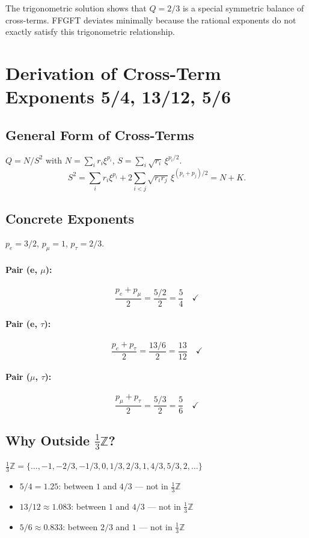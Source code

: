 The trigonometric solution shows that $Q=2/3$ is a special symmetric balance
of cross-terms. FFGFT deviates minimally because the rational exponents do not
exactly satisfy this trigonometric relationship.

\section{Derivation of Cross-Term Exponents 5/4, 13/12, 5/6}


\subsection{General Form of Cross-Terms}

$Q=N/S^2$ with $N=\sum_ir_i\xi^{p_i}$, $S=\sum_i\sqrt{r_i}\,\xi^{p_i/2}$.
\[
  S^2 = \sum_ir_i\xi^{p_i}+2\sum_{i<j}\sqrt{r_ir_j}\,\xi^{(p_i+p_j)/2} = N+K.
\]

\subsection{Concrete Exponents}

$p_e=3/2$, $p_\mu=1$, $p_\tau=2/3$.

\paragraph{Pair (e, $\mu$):}
\[
  \frac{p_e+p_\mu}{2} = \frac{5/2}{2} = \boxed{\frac{5}{4}} \quad\checkmark
\]

\paragraph{Pair (e, $\tau$):}
\[
  \frac{p_e+p_\tau}{2} = \frac{13/6}{2} = \boxed{\frac{13}{12}} \quad\checkmark
\]

\paragraph{Pair ($\mu$, $\tau$):}
\[
  \frac{p_\mu+p_\tau}{2} = \frac{5/3}{2} = \boxed{\frac{5}{6}} \quad\checkmark
\]

\subsection{Why Outside $\tfrac{1}{3}\mathbb{Z}$?}

$\tfrac{1}{3}\mathbb{Z}=\{\ldots,-1,-2/3,-1/3,0,1/3,2/3,1,4/3,5/3,2,\ldots\}$
\begin{itemize}
  \item $5/4=1.25$: between $1$ and $4/3$ --- not in $\tfrac{1}{3}\mathbb{Z}$
  \item $13/12\approx1.083$: between $1$ and $4/3$ --- not in $\tfrac{1}{3}\mathbb{Z}$
  \item $5/6\approx0.833$: between $2/3$ and $1$ --- not in $\tfrac{1}{3}\mathbb{Z}$
\end{itemize}

